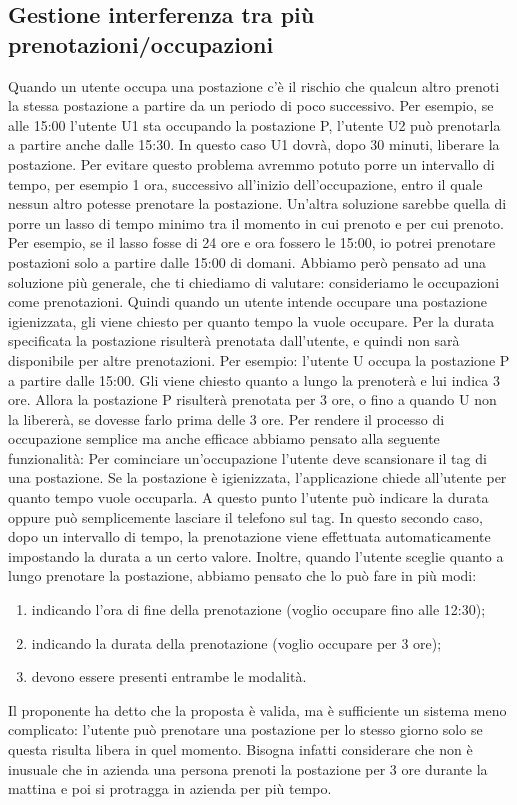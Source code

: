 \subsection*{Gestione interferenza tra più prenotazioni/occupazioni}
Quando un utente occupa una postazione c'è il rischio che qualcun altro prenoti la stessa postazione a partire da un periodo di poco successivo. Per esempio, se alle 15:00 l'utente U1 sta occupando la postazione P, l'utente U2 può prenotarla a partire anche dalle 15:30. In questo caso U1 dovrà, dopo 30 minuti, liberare la postazione.
Per evitare questo problema avremmo potuto porre un intervallo di tempo, per esempio 1 ora, successivo all'inizio dell'occupazione, entro il quale nessun altro potesse prenotare la postazione.
Un'altra soluzione sarebbe quella di porre un lasso di tempo minimo tra il momento in cui prenoto e per cui prenoto. Per esempio, se il lasso fosse di 24 ore e ora fossero le 15:00, io potrei prenotare postazioni solo a partire dalle 15:00 di domani.
Abbiamo però pensato ad una soluzione più generale, che ti chiediamo di valutare: consideriamo le occupazioni come prenotazioni.
Quindi quando un utente intende occupare una postazione igienizzata, gli viene chiesto per quanto tempo la vuole occupare. Per la durata specificata la postazione risulterà prenotata dall'utente, e quindi non sarà disponibile per altre prenotazioni. Per esempio: l'utente U occupa la postazione P a partire dalle 15:00. Gli viene chiesto quanto a lungo la prenoterà e lui indica 3 ore. Allora la postazione P risulterà prenotata per 3 ore, o fino a quando U non la libererà, se dovesse farlo prima delle 3 ore.
Per rendere il processo di occupazione semplice ma anche efficace abbiamo pensato alla seguente funzionalità: \newline
Per cominciare un'occupazione l'utente deve scansionare il tag di una postazione. Se la postazione è igienizzata, l'applicazione chiede all'utente per quanto tempo vuole occuparla. A questo punto l'utente può indicare la durata oppure può semplicemente lasciare il telefono sul tag.
In questo secondo caso, dopo un intervallo di tempo, la prenotazione viene effettuata automaticamente impostando la durata a un certo valore.
Inoltre, quando l'utente sceglie quanto a lungo prenotare la postazione, abbiamo pensato che lo può fare in più modi:
\begin{enumerate}
\item indicando l'ora di fine della prenotazione (voglio occupare fino alle 12:30);
\item indicando la durata della prenotazione (voglio occupare per 3 ore);
\item devono essere presenti entrambe le modalità.
\end{enumerate}
\indent Il proponente ha detto che la proposta è valida, ma è sufficiente un sistema meno complicato: l'utente può prenotare una postazione per lo stesso giorno solo se questa risulta libera in quel momento. Bisogna infatti considerare che non è inusuale che in azienda una persona prenoti la postazione per 3 ore durante la mattina e poi si protragga in azienda per più tempo.

